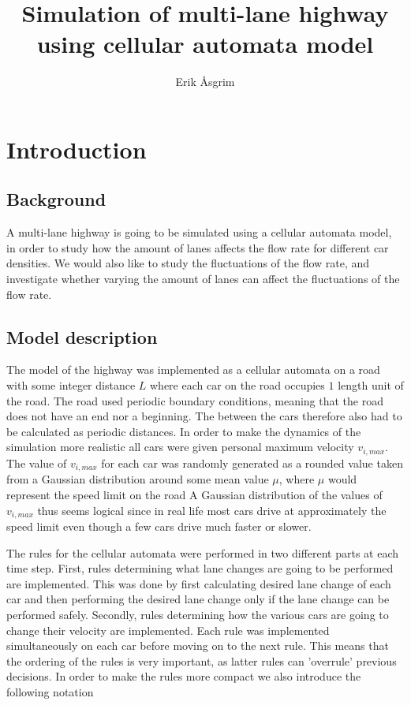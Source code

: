 \documentclass[a4paper,12pt]{article}
\title{Simulation of multi-lane highway using cellular automata model}
\author{Erik Åsgrim}
\begin{document}
\maketitle

\section*{Introduction}
\subsection*{Background}
A multi-lane highway is going to be simulated using a cellular automata model, in order to study how the amount of lanes affects the flow rate for different car densities. We would also
like to study the fluctuations of the flow rate, and investigate whether varying the amount of lanes can affect the fluctuations of the flow rate.
\subsection*{Model description}
The model of the highway was implemented as a cellular automata on a road with some integer distance $L$ where each car on the road occupies $1$ length unit of the road. 
The road used periodic boundary conditions, meaning that the road does not have an end nor a beginning. The between the cars therefore also had to be calculated as periodic distances.
In order to make the dynamics of the simulation more realistic all cars were given personal maximum velocity $v_{i,max}$. The value of $v_{i, max}$ for each car was randomly generated 
as a rounded value taken from a Gaussian distribution around some mean value $\mu$, where $\mu$ would represent the speed limit on the road A Gaussian distribution of the values of $v_{i, max}$ thus
seems logical since in real life most cars drive at approximately the speed limit even though a few cars drive much faster or slower.

The rules for the cellular automata were performed in two different parts at each time step.
First, rules determining what lane changes are going to be performed are implemented. This was done by first calculating desired lane change of each car and then
performing the desired lane change only if the lane change can be performed safely.
Secondly, rules determining how the various cars are going to change their velocity are implemented.
Each rule was implemented simultaneously on each car before moving on to the next rule. This means that the ordering of the rules is very important, as latter rules can 'overrule' previous decisions.
In order to make the rules more compact we also introduce the following notation
\end{document}
